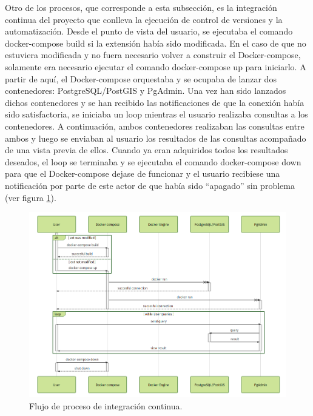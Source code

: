 Otro de los procesos, que corresponde a esta subsección, es la integración continua del proyecto que conlleva la ejecución de control de versiones y la automatización. Desde el punto de vista del usuario, se ejecutaba el comando  docker-compose build si la extensión había sido modificada. En el caso de que no estuviera modificada y no fuera necesario volver a construir el Docker-compose, solamente era necesario ejecutar el comando docker-compose up para iniciarlo. A partir de aquí, el Docker-compose orquestaba y se ocupaba de lanzar dos contenedores: PostgreSQL/PostGIS y PgAdmin. Una vez han sido lanzados dichos contenedores y se han recibido las notificaciones de que la conexión había sido satisfactoria, se iniciaba un loop mientras el usuario realizaba consultas a los contenedores. A continuación, ambos contenedores realizaban las consultas entre ambos y luego se enviaban al usuario los resultados de las consultas acompañado de una vista previa de ellos. Cuando ya eran adquiridos todos los resultados deseados, el loop se terminaba y se ejecutaba el comando docker-compose down para que el Docker-compose dejase de funcionar y el usuario recibiese una notificación por parte de este actor de que había sido “apagado” sin problema (ver figura \ref{fig:ci}).

\begin{figure}
\begin{center}
\includegraphics[width=\textwidth]{Metodologia/Figs/ci.png}
\caption{Flujo de proceso de integración continua. \label{fig:ci}}
\end{center}
\end{figure}


